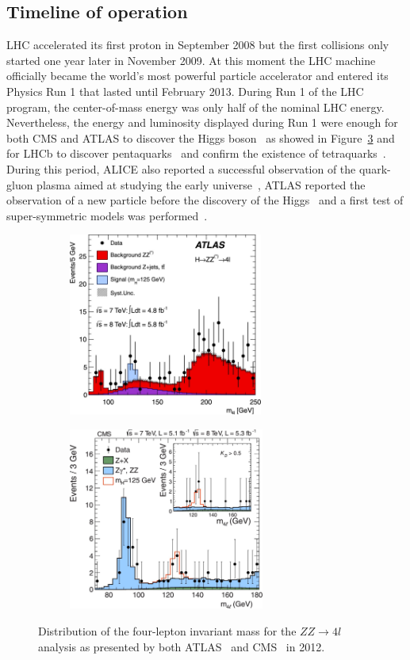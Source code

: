 	\subsection{Timeline of operation}
	\label{chapt2:ssec:timeline}
	
	LHC accelerated its first proton in September 2008 but the first collisions only started one year later in November 2009. At this moment the LHC machine officially became the world's most powerful particle accelerator and entered its Physics Run 1 that lasted until February 2013. During Run 1 of the LHC program, the center-of-mass energy was only half of the nominal LHC energy. Nevertheless, the energy and luminosity displayed during Run 1 were enough for both CMS and ATLAS to discover the Higgs boson~\cite{ATLAS2012,CMS2012} as showed in Figure~\ref{fig:Higgs} and for LHCb to discover pentaquarks~\cite{PENTAQUARK2015} and confirm the existence of tetraquarks~\cite{TETRAQUARK2017}. During this period, ALICE also reported a successful observation of the quark-gluon plasma aimed at studying the early universe~\cite{ALICEINFO}, ATLAS reported the observation of a new particle before the discovery of the Higgs~\cite{CHIB2012} and a first test of super-symmetric models was performed~\cite{B0SDECAY2013}.
	
	\begin{figure}[H]
		\begin{subfigure}{0.5\linewidth}
			\centering
			\includegraphics[height = 6cm]{fig/chapt2/Higgs-ATLAS-ZZ-4l.jpg}
			\caption{\label{fig:Higgs:A}}
		\end{subfigure}
		\begin{subfigure}{0.5\linewidth}
			\centering
			\includegraphics[height = 6cm]{fig/chapt2/Higgs-CMS-ZZ-4l.jpg}
			\caption{\label{fig:Higgs:B}}
		\end{subfigure}
		\caption{\label{fig:Higgs} Distribution of the four-lepton invariant mass for the $ZZ \rightarrow 4l$ analysis as presented by both ATLAS~\cite{ATLAS2012} and CMS~\cite{CMS2012} in 2012.}
	\end{figure}
	
